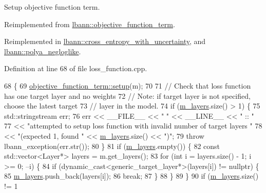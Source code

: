 Setup objective function term. 

Reimplemented from \hyperlink{classlbann_1_1objective__function__term_a6c8dbdf18aac8676098189fb7b178e91}{lbann\+::objective\+\_\+function\+\_\+term}.



Reimplemented in \hyperlink{classlbann_1_1cross__entropy__with__uncertainty_a44a47468f1d04734068d085417eeab93}{lbann\+::cross\+\_\+entropy\+\_\+with\+\_\+uncertainty}, and \hyperlink{classlbann_1_1polya__negloglike_a4a7ae8eef1ef216f60b158acb1853355}{lbann\+::polya\+\_\+negloglike}.



Definition at line 68 of file loss\+\_\+function.\+cpp.


\begin{DoxyCode}
68                                   \{
69   \hyperlink{classlbann_1_1objective__function__term_a6c8dbdf18aac8676098189fb7b178e91}{objective\_function\_term::setup}(m);
70 
71   \textcolor{comment}{// Check that loss function has one target layer and no weights}
72   \textcolor{comment}{// Note: if target layer is not specified, choose the latest target}
73   \textcolor{comment}{// layer in the model.}
74   \textcolor{keywordflow}{if} (\hyperlink{classlbann_1_1objective__function__term_a9269cf0a237eacd1e220ba2739f44334}{m\_layers}.size() > 1) \{
75     std::stringstream err;
76     err << \_\_FILE\_\_ << \textcolor{stringliteral}{" "} << \_\_LINE\_\_ << \textcolor{stringliteral}{" :: "}
77         << \textcolor{stringliteral}{"attempted to setup loss function with invalid number of target layers "}
78         << \textcolor{stringliteral}{"(expected 1, found "} << \hyperlink{classlbann_1_1objective__function__term_a9269cf0a237eacd1e220ba2739f44334}{m\_layers}.size() << \textcolor{stringliteral}{")"};
79     \textcolor{keywordflow}{throw} lbann\_exception(err.str());
80   \}
81   \textcolor{keywordflow}{if} (\hyperlink{classlbann_1_1objective__function__term_a9269cf0a237eacd1e220ba2739f44334}{m\_layers}.empty()) \{
82     \textcolor{keyword}{const} std::vector<Layer*> layers = m.get\_layers();
83     \textcolor{keywordflow}{for} (\textcolor{keywordtype}{int} i = layers.size() - 1; i >= 0; --i) \{
84       \textcolor{keywordflow}{if} (dynamic\_cast<generic\_target\_layer*>(layers[i]) != \textcolor{keyword}{nullptr}) \{
85         \hyperlink{classlbann_1_1objective__function__term_a9269cf0a237eacd1e220ba2739f44334}{m\_layers}.push\_back(layers[i]);
86         \textcolor{keywordflow}{break};
87       \}
88     \}
89   \}
90   \textcolor{keywordflow}{if} (\hyperlink{classlbann_1_1objective__function__term_a9269cf0a237eacd1e220ba2739f44334}{m\_layers}.size() != 1

\end{DoxyCode}

